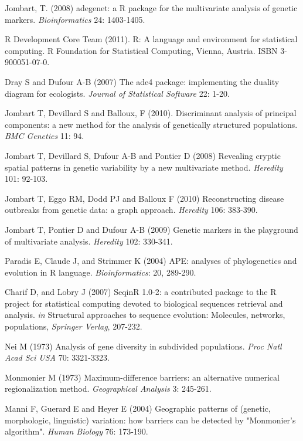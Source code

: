 \documentclass{article}
\begin{document}
\newpage
\begin{thebibliography}{9}

  Jombart, T. (2008) adegenet: a R package for the multivariate
  analysis of genetic markers. \textit{Bioinformatics} 24: 1403-1405.

  R Development Core Team (2011). R: A language and environment for
  statistical computing. R Foundation for Statistical Computing,
  Vienna, Austria. ISBN 3-900051-07-0.

  Dray S and Dufour A-B (2007) The ade4 package: implementing the duality diagram for ecologists. \textit{Journal of Statistical Software} 22: 1-20.

  Jombart T, Devillard S and Balloux, F (2010).
  Discriminant analysis of principal components: a new method for the analysis of genetically structured populations.
  \textit{BMC Genetics} 11: 94.

  Jombart T, Devillard S, Dufour A-B and Pontier D (2008) Revealing cryptic spatial
  patterns in genetic variability by a new multivariate method.  \textit{Heredity} 101: 92-103.

  Jombart T, Eggo RM, Dodd PJ and Balloux F (2010) Reconstructing disease outbreaks from genetic
  data: a graph approach. \textit{Heredity} 106: 383-390.

  Jombart T, Pontier D and Dufour A-B (2009) Genetic markers in the playground of multivariate analysis.
  \textit{Heredity} 102: 330-341.

  Paradis E, Claude J, and Strimmer K (2004) APE: analyses of phylogenetics and evolution in R language.
  \textit{Bioinformatics}: 20, 289-290.

  Charif D, and Lobry J (2007) SeqinR 1.0-2: a contributed package to the R project for statistical
  computing devoted to biological sequences retrieval and analysis. \textit{in} Structural approaches to sequence evolution: Molecules, networks, populations, \textit{Springer Verlag}, 207-232.

  Nei M (1973) Analysis of gene diversity in subdivided populations. \textit{Proc Natl Acad Sci USA} 70: 3321-3323.


  Monmonier M (1973) Maximum-difference barriers: an alternative numerical regionalization method. \textit{Geographical Analysis} 3: 245-261.

  Manni F, Guerard E and Heyer E (2004) Geographic patterns of (genetic, morphologic, linguistic)
  variation: how barriers can be detected by "Monmonier's algorithm". \textit{Human Biology} 76: 173-190.


\end{thebibliography}
\end{document}
